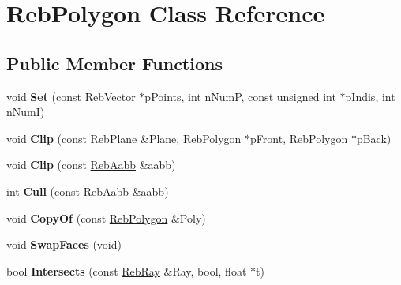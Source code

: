 \hypertarget{class_reb_polygon}{}\section{Reb\+Polygon Class Reference}
\label{class_reb_polygon}
\subsection*{Public Member Functions}
\begin{DoxyCompactItemize}
\item 
void {\bfseries Set} (const Reb\+Vector $\ast$p\+Points, int n\+NumP, const unsigned int $\ast$p\+Indis, int n\+NumI)\hypertarget{class_reb_polygon_a80cfd267874549bd84943609a47b6d2b}{}\label{class_reb_polygon_a80cfd267874549bd84943609a47b6d2b}

\item 
void {\bfseries Clip} (const \hyperlink{class_reb_plane}{Reb\+Plane} \&Plane, \hyperlink{class_reb_polygon}{Reb\+Polygon} $\ast$p\+Front, \hyperlink{class_reb_polygon}{Reb\+Polygon} $\ast$p\+Back)\hypertarget{class_reb_polygon_a0383328d939ee7036a9c2bd3dffaecd9}{}\label{class_reb_polygon_a0383328d939ee7036a9c2bd3dffaecd9}

\item 
void {\bfseries Clip} (const \hyperlink{class_reb_aabb}{Reb\+Aabb} \&aabb)\hypertarget{class_reb_polygon_a37386b427944bb81774ac5a1ee3c3392}{}\label{class_reb_polygon_a37386b427944bb81774ac5a1ee3c3392}

\item 
int {\bfseries Cull} (const \hyperlink{class_reb_aabb}{Reb\+Aabb} \&aabb)\hypertarget{class_reb_polygon_ab57e7be7a808c6a3f95677e6a363bc92}{}\label{class_reb_polygon_ab57e7be7a808c6a3f95677e6a363bc92}

\item 
void {\bfseries Copy\+Of} (const \hyperlink{class_reb_polygon}{Reb\+Polygon} \&Poly)\hypertarget{class_reb_polygon_adb7076a612b29b7b2a7ff46933270a6f}{}\label{class_reb_polygon_adb7076a612b29b7b2a7ff46933270a6f}

\item 
void {\bfseries Swap\+Faces} (void)\hypertarget{class_reb_polygon_a2eef31d2dd1eb42b62b33de34f816dd1}{}\label{class_reb_polygon_a2eef31d2dd1eb42b62b33de34f816dd1}

\item 
bool {\bfseries Intersects} (const \hyperlink{class_reb_ray}{Reb\+Ray} \&Ray, bool, float $\ast$t)\hypertarget{class_reb_polygon_ad95b31b69f79402b11a520fad0622d80}{}\label{class_reb_polygon_ad95b31b69f79402b11a520fad0622d80}


\end{DoxyCompactItemize}
